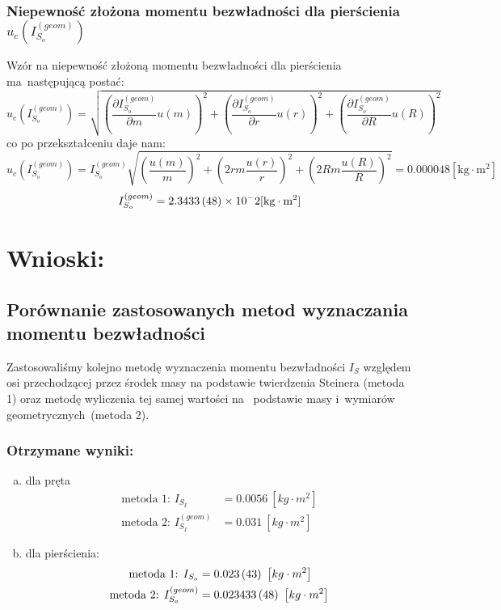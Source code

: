 \documentclass{fizraport}
\begin{document}
\subsubsection{Niepewność złożona momentu bezwładności dla pierścienia $u_c\left(I_{S_o}^{(geom)}\right)$}
Wzór na niepewność złożoną momentu bezwładności  dla pierścienia ma~następującą postać:
\[u_c\left(I_{S_o}^{(geom)}\right) = \sqrt{
\left( \frac{\partial I_{S_o}^{(geom)}}{\partial m}u(m) \right) ^2+
\left( \frac{\partial I_{S_o}^{(geom)}}{\partial r}u(r) \right) ^2+
\left( \frac{\partial I_{S_o}^{(geom)}}{\partial R}u(R) \right) ^2}\]
co po przekształceniu daje nam:
\[u_c\left(I_{S_o}^{(geom)}\right) = I_{S_o}^{(geom)}\sqrt{
\left(\frac{u(m)}{m}\right)^2+\left(2rm\frac{u(r)}{r}\right)^2+\left(2Rm\frac{u(R)}{R}\right)^2
}=0.000048[\text{kg}\cdot\text{m}^2]\]
\[I_{S_o}^{(geom)}=\Scientific{\uncertain{2.3433}{48}}{-2}[\text{kg}\cdot\text{m}^2]\]


\pagebreak
\section{Wnioski:}
\subsection{Porównanie zastosowanych metod wyznaczania momentu bezwładności}
Zastosowaliśmy kolejno metodę wyznaczenia momentu bezwładności $I_S$ względem osi przechodzącej przez środek masy na podstawie twierdzenia Steinera (metoda 1) oraz metodę wyliczenia tej samej wartości na
~podstawie masy i~wymiarów geometrycznych~(metoda 2).

\subsubsection{Otrzymane wyniki:}
\begin{enumerate}[a)]
\item dla pręta
\begin{align*}
\text{metoda 1: } I_{S_I}&=0.0056~\left[kg\cdot m^2\right] \\
\text{metoda 2: } I_{S_I}^{(geom)}&=0.031~\left[kg\cdot m^2\right]
\end{align*}
\item dla pierścienia:
\begin{align*}
\text{metoda 1: }  I_{S_o}&=\uncertain{0.023}{43}~\left[kg\cdot m^2\right] \\
\text{metoda 2: } I_{S_o}^{(geom)}&=\uncertain{0.023433}{48}~\left[kg\cdot m^2\right]
\end{align*}
\end{enumerate}
\end{document}
